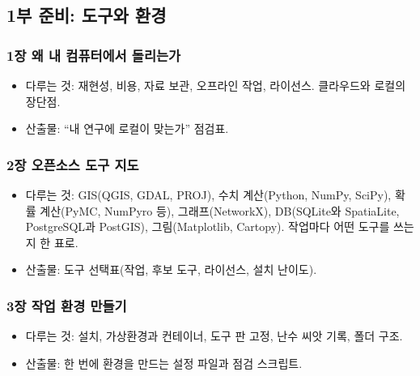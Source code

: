 \documentclass[10pt,a4paper]{article}
\providecommand{\tightlist}{\setlength{\itemsep}{0pt}\setlength{\parskip}{0pt}}
\begin{document}
\hypertarget{uxbd80-uxc900uxbe44-uxb3c4uxad6cuxc640-uxd658uxacbd}{%
\subsection{1부 준비: 도구와 환경}\label{uxbd80-uxc900uxbe44-uxb3c4uxad6cuxc640-uxd658uxacbd}}

\hypertarget{uxc7a5-uxc65c-uxb0b4-uxcef4uxd4e8uxd130uxc5d0uxc11c-uxb3ccuxb9acuxb294uxac00}{%
\subsubsection{1장 왜 내 컴퓨터에서 돌리는가}\label{uxc7a5-uxc65c-uxb0b4-uxcef4uxd4e8uxd130uxc5d0uxc11c-uxb3ccuxb9acuxb294uxac00}}

\begin{itemize}
\tightlist
\item
  다루는 것: 재현성, 비용, 자료 보관, 오프라인 작업, 라이선스. 클라우드와 로컬의 장단점.
\item
  산출물: ``내 연구에 로컬이 맞는가'' 점검표.
\end{itemize}

\hypertarget{uxc7a5-uxc624uxd508uxc18cuxc2a4-uxb3c4uxad6c-uxc9c0uxb3c4}{%
\subsubsection{2장 오픈소스 도구 지도}\label{uxc7a5-uxc624uxd508uxc18cuxc2a4-uxb3c4uxad6c-uxc9c0uxb3c4}}

\begin{itemize}
\tightlist
\item
  다루는 것: GIS(QGIS, GDAL, PROJ), 수치 계산(Python, NumPy, SciPy), 확률 계산(PyMC, NumPyro 등), 그래프(NetworkX), DB(SQLite와 SpatiaLite, PostgreSQL과 PostGIS), 그림(Matplotlib, Cartopy). 작업마다 어떤 도구를 쓰는지 한 표로.
\item
  산출물: 도구 선택표(작업, 후보 도구, 라이선스, 설치 난이도).
\end{itemize}

\hypertarget{uxc7a5-uxc791uxc5c5-uxd658uxacbd-uxb9ccuxb4e4uxae30}{%
\subsubsection{3장 작업 환경 만들기}\label{uxc7a5-uxc791uxc5c5-uxd658uxacbd-uxb9ccuxb4e4uxae30}}

\begin{itemize}
\tightlist
\item
  다루는 것: 설치, 가상환경과 컨테이너, 도구 판 고정, 난수 씨앗 기록, 폴더 구조.
\item
  산출물: 한 번에 환경을 만드는 설정 파일과 점검 스크립트.
\end{itemize}
\end{document}
